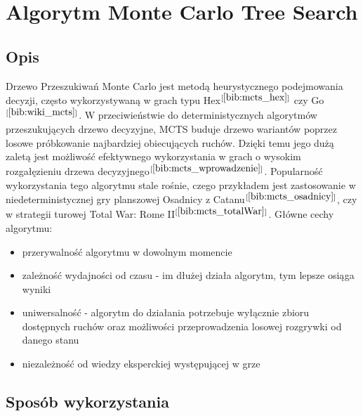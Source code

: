 \section{Algorytm Monte Carlo Tree Search}
\label{sec:mcts}

\subsection{Opis}

Drzewo Przeszukiwań Monte Carlo jest metodą heurystycznego podejmowania decyzji, często wykorzystywaną w grach typu Hex$^{[\ref{bib:mcts_hex}]}$ czy Go$^{[\ref{bib:wiki_mcts}]}$. W przeciwieństwie do deterministycznych algorytmów przeszukujących drzewo decyzyjne, MCTS buduje drzewo wariantów poprzez losowe próbkowanie najbardziej obiecujących ruchów. Dzięki temu jego dużą zaletą jest możliwość efektywnego wykorzystania w grach o wysokim rozgałęzieniu drzewa decyzyjnego$^{[\ref{bib:mcts_wprowadzenie}]}$. Popularność wykorzystania tego algorytmu stale rośnie, czego przykładem jest zastosowanie w niedeterministycznej gry planszowej Osadnicy z Catanu$^{[\ref{bib:mcts_osadnicy}]}$, czy w strategii turowej Total War: Rome II$^{[\ref{bib:mcts_totalWar}]}$. Główne cechy algorytmu:
\begin{itemize}
	\item przerywalność algorytmu w dowolnym momencie
	\item zależność wydajności od czasu - im dłużej działa algorytm, tym lepsze osiąga wyniki
	\item uniwersalność - algorytm do działania potrzebuje wyłącznie zbioru dostępnych ruchów oraz możliwości przeprowadzenia losowej rozgrywki od danego stanu
	\item niezależność od wiedzy eksperckiej występującej w grze
\end{itemize}

\subsection{Sposób wykorzystania}


